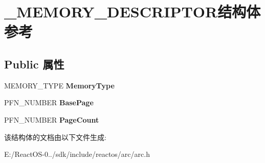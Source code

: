 \hypertarget{struct___m_e_m_o_r_y___d_e_s_c_r_i_p_t_o_r}{}\section{\+\_\+\+M\+E\+M\+O\+R\+Y\+\_\+\+D\+E\+S\+C\+R\+I\+P\+T\+O\+R结构体 参考}
\label{struct___m_e_m_o_r_y___d_e_s_c_r_i_p_t_o_r}
\subsection*{Public 属性}
\begin{DoxyCompactItemize}
\item 
\mbox{\label{struct___m_e_m_o_r_y___d_e_s_c_r_i_p_t_o_r_af7c2732fe2f3d48991eaa08b20d39630}} 
M\+E\+M\+O\+R\+Y\+\_\+\+T\+Y\+PE {\bfseries Memory\+Type}
\item 
\mbox{\label{struct___m_e_m_o_r_y___d_e_s_c_r_i_p_t_o_r_a71cfdd492c72f7e2c59bcd8a8843afee}} 
P\+F\+N\+\_\+\+N\+U\+M\+B\+ER {\bfseries Base\+Page}
\item 
\mbox{\label{struct___m_e_m_o_r_y___d_e_s_c_r_i_p_t_o_r_ab7cad7769c323945954576481a3cf12e}} 
P\+F\+N\+\_\+\+N\+U\+M\+B\+ER {\bfseries Page\+Count}
\end{DoxyCompactItemize}


该结构体的文档由以下文件生成\+:\begin{DoxyCompactItemize}
\item 
E\+:/\+React\+O\+S-\/0../sdk/include/reactos/arc/arc.\+h\end{DoxyCompactItemize}
